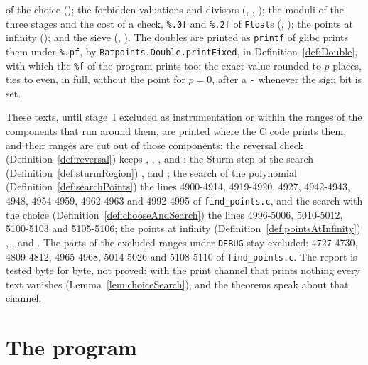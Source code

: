\begin{definition}
  of the choice (); the forbidden valuations and divisors
  (, ,
  ); the moduli of the three stages and the cost of a check,
  \verb|%.0f| and \verb|%.2f| of \verb|Float|s (,
  ); the points at infinity
  (); and the sieve (,
  ). The doubles are printed as \verb|printf| of glibc prints
  them under \verb|%.pf|, by \verb|Ratpoints.Double.printFixed|, in Definition~\ref{def:Double},
  with which the \verb|%f| of the program prints too: the exact value rounded to $p$ places, ties to
  even, in full, without the point for $p = 0$, after a \verb|-| whenever the sign bit is set.
\end{definition}

These texts, until stage~I excluded as instrumentation or within the ranges of the components that
run around them, are printed where the C code prints them, and their ranges are cut out of those
components: the reversal check (Definition~\ref{def:reversal}) keeps
, ,
,  and
; the Sturm step of the search (Definition~\ref{def:sturmRegion})
,  and
; the search of the polynomial
(Definition~\ref{def:searchPoints}) the lines 4900-4914, 4919-4920, 4927, 4942-4943, 4948,
4954-4959, 4962-4963 and 4992-4995 of \verb|find_points.c|, and the search with the choice
(Definition~\ref{def:chooseAndSearch}) the lines 4996-5006, 5010-5012, 5100-5103 and 5105-5106; the
points at infinity (Definition~\ref{def:pointsAtInfinity}) ,
,  and
. The parts of the excluded ranges under \verb|DEBUG| stay
excluded: 4727-4730, 4809-4812, 4965-4968, 5014-5026 and 5108-5110 of \verb|find_points.c|. The
report is tested byte for byte, not proved: with the print channel that prints nothing every text
vanishes (Lemma~\ref{lem:choiceSearch}), and the theorems speak about that channel.

\section{The program}\label{sec:moduliCli}

